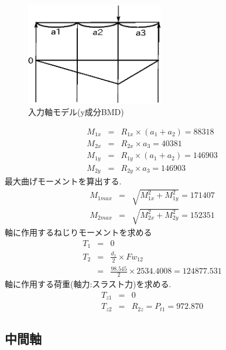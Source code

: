 \begin{figure}[htbp]
\begin{center}
\includegraphics[width=6cm]{../pictures/oneccwy.eps}
\end{center}
\caption{入力軸モデル(y成分BMD)}
\end{figure}
\begin{eqnarray}
M_{1x} &=& R_{1x} \times (a_1+a_2)=88318\\
M_{2x} &=& R_{2x} \times a_3=40381\\
M_{1y} &=& R_{1y} \times (a_1+a_2)= 146903\\
M_{2y} &=& R_{2y} \times a_3= 146903 
\end{eqnarray}
最大曲げモーメントを算出する.
\begin{eqnarray}
M_{1max} &=& \sqrt {M_{1x}^2+M_{1y}^2}=171407\\
M_{2max} &=& \sqrt {M_{2x}^2+M_{2y}^2}=152351
\end{eqnarray}
軸に作用するねじりモーメントを求める
\begin{eqnarray}
T_{1} &=& 0\\
T_{2} &=& \frac{d_1}{2} \times Fw_{12}\\
      &=& \frac{98.545}{2} \times 2534.4008 = 124877.531
\end{eqnarray}
軸に作用する荷重(軸力:スラスト力)を求める.
\begin{eqnarray}
T_{z1} &=& 0\\
T_{z2} &=& R_{2z} = P_{t1} = 972.870
\end{eqnarray}




\subsection{中間軸}
